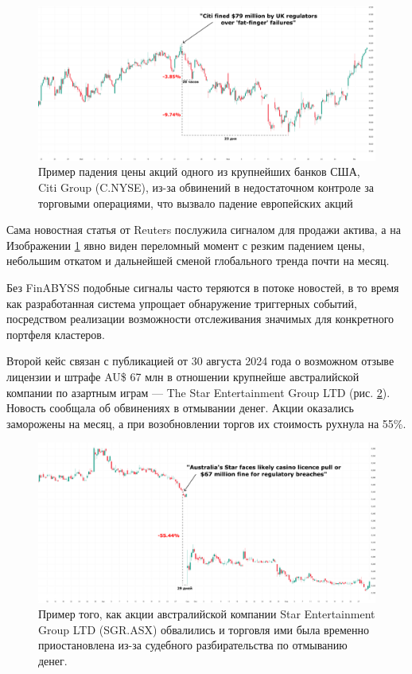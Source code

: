 \begin{figure}[H]
    \centering
    \includegraphics[width=1\linewidth]{img/citi_group.png}
    \caption{Пример падения цены акций одного из крупнейших банков США, Citi Group (C.NYSE),
    из-за обвинений в недостаточном контроле за торговыми операциями, что вызвало падение европейских акций}
    \label{fig:citi_group}
\end{figure}

Сама новостная статья от Reuters послужила сигналом для продажи актива, а на Изображении \ref{fig:citi_group} явно виден
переломный момент с резким падением цены, небольшим откатом и дальнейшей сменой глобального тренда почти на месяц.

Без FinABYSS подобные сигналы часто теряются в потоке новостей, в то время как разработанная система упрощает обнаружение
триггерных событий, посредством реализации возможности отслеживания значимых для конкретного портфеля кластеров.

Второй кейс связан с публикацией от 30 августа 2024 года о возможном отзыве лицензии и штрафе AU\$ 67 млн в отношении крупнейше
 австралийской компании по азартным играм --- The Star Entertainment Group LTD (рис. \ref{fig:star_entertainment}). Новость сообщала
 об обвинениях  в отмывании денег. Акции оказались заморожены на месяц, а при возобновлении торгов их стоимость рухнула на 55\%.

\begin{figure}[H]
    \centering
    \includegraphics[width=1\linewidth]{img/star_entertainment.png}
    \caption{Пример того, как акции австралийской компании Star Entertainment Group LTD (SGR.ASX)
    обвалились и торговля ими была временно приостановлена из-за судебного разбирательства по отмыванию денег.}
    \label{fig:star_entertainment}
\end{figure}

